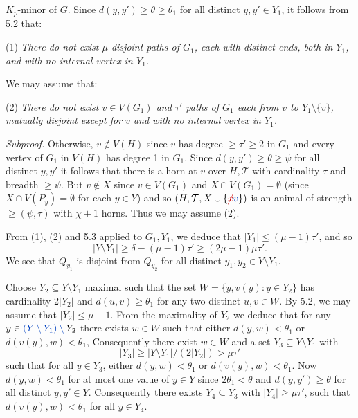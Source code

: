 \noindent $K_p$-minor of $G$. Since $d(y, y') \ge \theta \ge \theta_1$ for all distinct $y, y' \in Y_1$, it follows from 5.2 that:

\hspace*{12pt}(1) \textit{There do not exist $\mu$ disjoint paths of $G_1$, each with distinct ends, both in $Y_1$, and with no internal vertex in $Y_1$.}

We may assume that:

\hspace*{12pt}(2) \textit{There do not exist $v \in V(G_1)$ and $\tau'$ paths of $G_1$ each from $v$ to $Y_1 \setminus \{v\}$, mutually disjoint except for $v$ and with no internal vertex in $Y_1$.}

\textit{Subproof.} Otherwise, $v \notin V(H)$ since $v$ has degree $\ge \tau' \ge 2$ in $G_1$ and every vertex of $G_1$ in $V(H)$ has degree 1 in $G_1$. Since $d(y, y') \ge \theta \ge \psi$ for all distinct $y, y'$ it follows that there is a horn at $v$ over $H, \mathcal{T}$ with cardinality $\tau$ and breadth $\ge \psi$. But $v \notin X$ since $v \in V(G_1)$ and $X \cap V(G_1) = \emptyset$ (since $X \cap V(P_y) = \emptyset$ for each $y \in Y$) and so $(H, \mathcal{T}, X \cup \{\delm{x}\fix{v}\})$ is an animal of strength $\ge (\psi, \tau)$ with $\chi + 1$ horns. Thus we may assume (2).

From (1), (2) and 5.3 applied to $G_1, Y_1$, we deduce that $|Y_1| \le (\mu - 1)\tau'$, and so
\begin{equation*}
|Y \setminus Y_1| \ge \delta - (\mu - 1)\tau' \ge (2\mu - 1)\mu\tau'.
\end{equation*}
We see that $Q_{y_1}$ is disjoint from $Q_{y_2}$ for all distinct $y_1, y_2 \in Y \setminus Y_1$.

Choose $Y_2 \subseteq Y \setminus Y_1$ maximal such that the set $W = \{y, v(y) : y \in Y_2\}$ has cardinality $2|Y_2|$ and $d(u, v) \ge \theta_1$ for any two distinct $u, v \in W$. By 5.2, we may assume that $|Y_2| \le \mu - 1$. From the maximality of $Y_2$ we deduce that for any $y \in \fix{(Y \setminus Y_1) \setminus{}} Y_2$ there exists $w \in W$ such that either $d(y, w) < \theta_1$ or $d(v(y), w) < \theta_1$, Consequently there exist $w \in W$ and a set $Y_3 \subseteq Y \setminus Y_1$ with
\begin{equation*}
|Y_3| \ge |Y \setminus Y_1|/(2|Y_2|) > \mu\tau'
\end{equation*}
such that for all $y \in Y_3$, either $d(y, w) < \theta_1$ or $d(v(y), w) < \theta_1$. Now $d(y, w) < \theta_1$ for at most one value of $y \in Y$ since $2\theta_1 < \theta$ and $d(y, y') \ge \theta$ for all distinct $y, y' \in Y$. Consequently there exists $Y_4 \subseteq Y_3$ with $|Y_4| \ge \mu\tau'$, such that $d(v(y), w) < \theta_1$ for all $y \in Y_4$.

